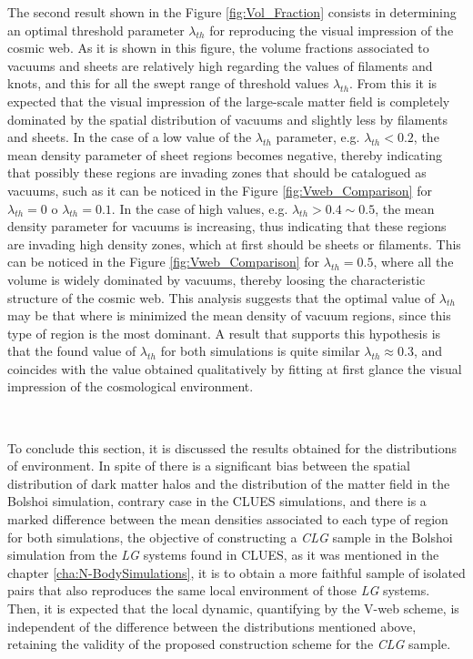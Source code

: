 The second result shown in the Figure \ref{fig:Vol_Fraction} consists in
determining an optimal threshold parameter $\lambda_{th}$ for reproducing
the visual impression of the cosmic web. As it is shown in this figure,
the volume fractions associated to vacuums and sheets are relatively high
regarding the values of filaments and knots, and this for all the swept 
range of threshold values $\lambda_{th}$. From this it is expected that 
the visual impression of the large-scale matter field is completely 
dominated by the spatial distribution of vacuums and slightly less by 
filaments and sheets. In the case of a low value of the $\lambda_{th}$ 
parameter, e.g. $\lambda_{th}<0.2$, the mean density parameter of sheet 
regions becomes negative, thereby indicating that possibly these regions 
are invading zones that should be catalogued as vacuums, such as it can be 
noticed in the Figure \ref{fig:Vweb_Comparison} for $\lambda_{th} = 0$ o 
$\lambda_{th} = 0.1$. In the case of high values, e.g. $\lambda_{th} > 
0.4\sim 0.5$, the mean density parameter for vacuums is increasing, thus 
indicating that these regions are invading high density zones, which at 
first should be sheets or filaments. This can be noticed in the Figure 
\ref{fig:Vweb_Comparison} for $\lambda_{th} = 0.5$, where all the volume 
is widely dominated by vacuums, thereby loosing the characteristic 
structure of the cosmic web. This analysis suggests that the optimal value
of $\lambda_{th}$ may be that where is minimized the mean density of 
vacuum regions, since this type of region is the most dominant. A result
that supports this hypothesis is that the found value of $\lambda_{th}$
for both simulations is quite similar $\lambda_{th}\approx 0.3$, and
coincides with the value obtained qualitatively by fitting at first glance 
the visual impression of the cosmological environment.

\

To conclude this section, it is discussed the results obtained for the 
distributions of environment. In spite of there is a significant bias 
between the spatial distribution of dark matter halos and the distribution
of the matter field in the Bolshoi simulation, contrary case in the CLUES 
simulations, and there is a marked difference between the mean densities
associated to each type of region for both simulations, the objective of 
constructing a \textit{CLG} sample in the Bolshoi simulation from the 
\textit{LG} systems found in CLUES, as it was mentioned in the chapter 
\ref{cha:N-BodySimulations}, it is to obtain a more faithful sample of 
isolated pairs that also reproduces the same local environment of those
\textit{LG} systems. Then, it is expected that the local dynamic, 
quantifying by the V-web scheme, is independent of the difference between
the distributions mentioned above, retaining the validity of the proposed
construction scheme for the \textit{CLG} sample.



